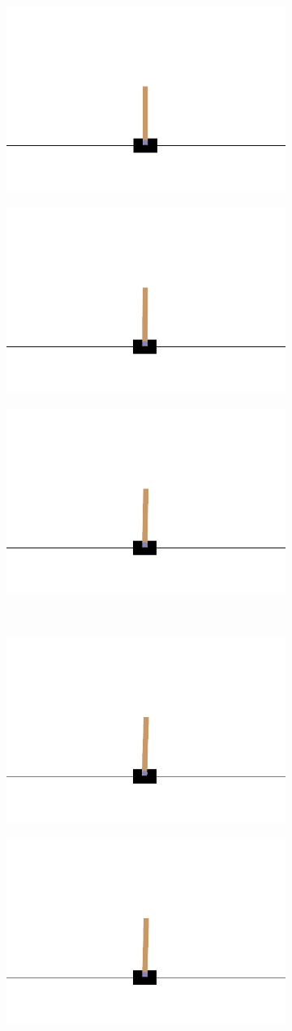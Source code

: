 \begin{figure}[H]
	\centering
	\begin{subfigure}
		\centering
		\includegraphics[width=0.3\linewidth]{Images/frames/GA/6.png}
	\end{subfigure}
	\hfill
	\begin{subfigure}
		\centering
		\includegraphics[width=0.3\linewidth]{Images/frames/GA/9.png}
	\end{subfigure}
	\hfill
	\begin{subfigure}
		\centering
		\includegraphics[width=0.3\linewidth]{Images/frames/GA/12.png}
	\end{subfigure}
	\\
	\begin{subfigure}
		\centering
		\includegraphics[width=0.3\linewidth]{Images/frames/GA/15.png}
	\end{subfigure}
	\hfill
	\begin{subfigure}
		\centering
		\includegraphics[width=0.3\linewidth]{Images/frames/GA/18.png}
	\end{subfigure}

\end{figure}
